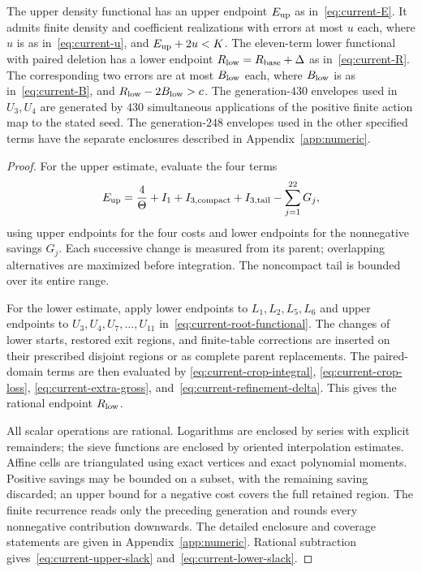 \begin{lemma}
\label{lem:numerical-endpoints}
The upper density functional has an upper endpoint $E_{\rm up}$ as
in~\eqref{eq:current-E}. It admits finite density and coefficient
realizations with errors at most $u$ each, where $u$ is
as in~\eqref{eq:current-u}, and $E_{\rm up}+2u<K$.
The eleven-term lower functional with paired deletion has a lower
endpoint $R_{\rm low}=R_{\rm base}+\Delta$ as in~\eqref{eq:current-R}.
The corresponding two errors are at most $B_{\rm low}$ each, where $B_{\rm low}$ is
as in~\eqref{eq:current-B}, and $R_{\rm low}-2B_{\rm low}>c$.
The generation-$430$ envelopes used in $U_3,U_4$ are generated by
$430$ simultaneous applications of the positive finite action map
to the stated seed. The generation-$248$ envelopes used in the other
specified terms have the separate enclosures described in
Appendix~\ref{app:numeric}.
\end{lemma}

\begin{proof}
For the upper estimate, evaluate the four terms
\[
 E_{\rm up}=\frac4\Theta+I_1+I_{3,\mathrm{compact}}+I_{3,\mathrm{tail}}
       -\sum_{j=1}^{22}G_j,
\]
using upper endpoints for the four costs and lower endpoints for the
nonnegative savings $G_j$. Each successive change is measured from its
parent; overlapping alternatives are maximized before integration.
The noncompact tail is bounded over its entire range.

For the lower estimate, apply lower endpoints to $L_1,L_2,L_5,L_6$
and upper endpoints to $U_3,U_4,U_7,\ldots,U_{11}$
in~\eqref{eq:current-root-functional}. The changes of lower starts,
restored exit regions, and finite-table corrections are inserted on
their prescribed disjoint regions or as complete parent replacements.
The paired-domain terms are then evaluated by
\eqref{eq:current-crop-integral}, \eqref{eq:current-crop-loss},
\eqref{eq:current-extra-gross}, and~\eqref{eq:current-refinement-delta}.
This gives the rational endpoint $R_{\rm low}$.

All scalar operations are rational. Logarithms are enclosed by series
with explicit remainders; the sieve functions are enclosed by
oriented interpolation estimates. Affine cells are triangulated using
exact vertices and exact polynomial moments. Positive savings may be
bounded on a subset, with the remaining saving discarded; an upper
bound for a negative cost covers the full retained region. The finite
recurrence reads only the preceding generation and rounds every
nonnegative contribution downwards. The detailed enclosure and coverage
statements are given in Appendix~\ref{app:numeric}. Rational subtraction
gives~\eqref{eq:current-upper-slack} and~\eqref{eq:current-lower-slack}.
\end{proof}

